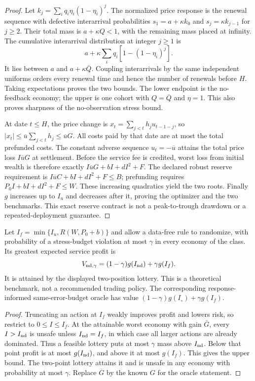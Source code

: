 \begin{proof}
Let $k_j=\sum_iq_i\eta_i(1-\eta_i)^j$. The normalized price response is
the renewal sequence with defective interarrival probabilities
$s_1=a+\kappa k_0$ and $s_j=\kappa k_{j-1}$ for $j\ge2$.
Their total mass is $a+\kappa Q<1$, with the remaining mass placed at
infinity. The cumulative interarrival distribution at integer $j\ge1$ is
\[
 a+\kappa\sum_iq_i[1-(1-\eta_i)^j].
\]
It lies between $a$ and $a+\kappa\overline Q$. Coupling interarrivals by
the same independent uniforms orders every renewal time and hence the
number of renewals before $H$. Taking expectations proves the two bounds.
The lower endpoint is the no-feedback economy; the upper is one cohort
with $Q=\overline Q$ and $\eta=1$. This also proves sharpness of the
no-observation stress bound.

At date $t\le H$, the price change is
$x_t=\sum_{j<t}h_j u_{t-1-j}$, so
$|x_t|\le\overline u\sum_{j<t}h_j\le\overline uG$.
All costs paid by that date are at most the total prefunded costs.
The constant adverse sequence $u_t=-\overline u$ attains the total price
loss $I\overline uG$ at settlement. Before the service fee is credited,
worst loss from initial wealth is therefore exactly
$I\overline uG+bI+dI^2+F$. The declared robust reserve requirement is
$I\overline uC+bI+dI^2+F\le B$; prefunding requires
$P_0I+bI+dI^2+F\le W$. These increasing quadratics yield the two roots.
Finally $g$ increases up to $I_u$ and decreases after it, proving the
optimizer and the two benchmarks. This exact reserve contract is not a
peak-to-trough drawdown or a repeated-deployment guarantee.
\end{proof}

\begin{lemma}\label{fhc:nodata-chance}
Let $I_f=\min\{I_u,R(W,P_0+b)\}$ and allow a data-free rule to randomize,
with probability of a stress-budget violation at most $\gamma$ in every
economy of the class. Its greatest expected service profit is
\[
 V_{{\rm nd},\gamma}=(1-\gamma)g(I_{\rm nd})+\gamma g(I_f).
\]
It is attained by the displayed two-position lottery. This is a theoretical
benchmark, not a recommended trading policy. The corresponding response-
informed same-error-budget oracle has value
$(1-\gamma)g(I_\circ)+\gamma g(I_f)$.
\end{lemma}

\begin{proof}
Truncating an action at $I_f$ weakly improves profit and lowers risk, so
restrict to $0\le I\le I_f$. At the attainable worst economy with gain
$\overline G$, every $I>I_{\rm nd}$ is unsafe unless $I_{\rm nd}=I_f$,
in which case all larger actions are already dominated. Thus a feasible
lottery puts at most $\gamma$ mass above $I_{\rm nd}$. Below that point
profit is at most $g(I_{\rm nd})$, and above it at most $g(I_f)$.
This gives the upper bound. The two-point lottery attains it and is unsafe
in any economy with probability at most $\gamma$. Replace $\overline G$
by the known $G$ for the oracle statement.
\end{proof}

